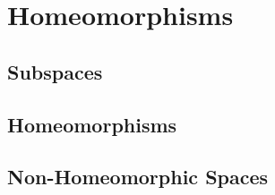 \chapter{Homeomorphisms}

\section{Subspaces}



\section{Homeomorphisms}



\section{Non-Homeomorphic Spaces}


